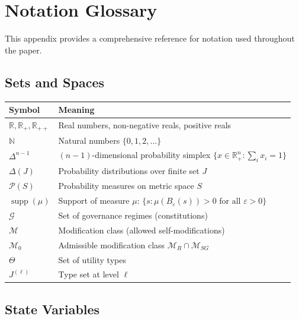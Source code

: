 \documentclass[12pt]{article}
\newcommand{\R}{\mathbb{R}}
\newcommand{\N}{\mathbb{N}}
\DeclareMathOperator{\supp}{supp}
\begin{document}
\section{Notation Glossary}
\label{app:notation}

This appendix provides a comprehensive reference for notation used throughout the paper.

\subsection{Sets and Spaces}

\begin{tabular}{ll}
\toprule
\textbf{Symbol} & \textbf{Meaning} \\
\midrule
$\R, \R_+, \R_{++}$ & Real numbers, non-negative reals, positive reals \\
$\N$ & Natural numbers $\{0, 1, 2, \ldots\}$ \\
$\Delta^{n-1}$ & $(n-1)$-dimensional probability simplex $\{x \in \R^n_+ : \sum_i x_i = 1\}$ \\
$\Delta(J)$ & Probability distributions over finite set $J$ \\
$\mathcal{P}(S)$ & Probability measures on metric space $S$ \\
$\supp(\mu)$ & Support of measure $\mu$: $\{s : \mu(B_\varepsilon(s)) > 0 \text{ for all } \varepsilon > 0\}$ \\
$\mathcal{G}$ & Set of governance regimes (constitutions) \\
$\mathcal{M}$ & Modification class (allowed self-modifications) \\
$\mathcal{M}_0$ & Admissible modification class $\mathcal{M}_R \cap \mathcal{M}_{SG}$ \\
$\Theta$ & Set of utility types \\
$J^{(\ell)}$ & Type set at level $\ell$ \\
\bottomrule
\end{tabular}

\subsection{State Variables}
\end{document}

